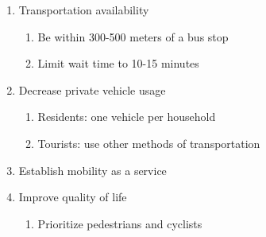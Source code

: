 \documentclass[12pt]{article}                         %
\begin{document}
\begin{enumerate}
    \item Transportation availability
    \begin{enumerate}
        \item Be within 300-500 meters of a bus stop
        \item Limit wait time to 10-15 minutes
    \end{enumerate}
    \item Decrease private vehicle usage
    \begin{enumerate}
        \item Residents: one vehicle per household
        \item Tourists: use other methods of transportation
    \end{enumerate}
    \item Establish mobility as a service
    \item Improve quality of life
    \begin{enumerate}
        \item Prioritize pedestrians and cyclists
    \end{enumerate}
\end{enumerate}


\newpage


\end{document}
